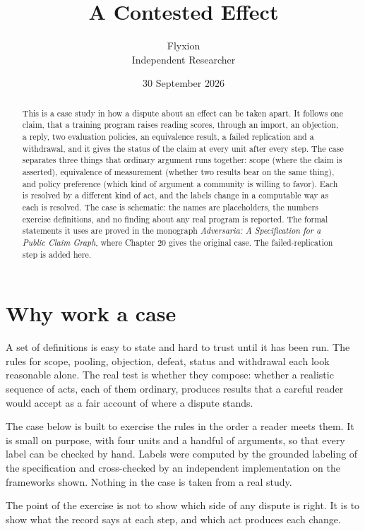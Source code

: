\documentclass[11pt]{article}
\title{A Contested Effect}
\author{Flyxion\\\small Independent Researcher}
\date{30 September 2026}
\begin{document}
\maketitle

\begin{abstract}
\noindent
This is a case study in how a dispute about an effect can be taken apart. It follows one claim, that a training program raises reading scores, through an import, an objection, a reply, two evaluation policies, an equivalence result, a failed replication and a withdrawal, and it gives the status of the claim at every unit after every step. The case separates three things that ordinary argument runs together: scope (where the claim is asserted), equivalence of measurement (whether two results bear on the same thing), and policy preference (which kind of argument a community is willing to favor). Each is resolved by a different kind of act, and the labels change in a computable way as each is resolved. The case is schematic: the names are placeholders, the numbers exercise definitions, and no finding about any real program is reported. The formal statements it uses are proved in the monograph \emph{Adversaria: A Specification for a Public Claim Graph}, where Chapter 20 gives the original case. The failed-replication step is added here.
\end{abstract}

\section{Why work a case}

A set of definitions is easy to state and hard to trust until it has been run. The rules for scope, pooling, objection, defeat, status and withdrawal each look reasonable alone. The real test is whether they compose: whether a realistic sequence of acts, each of them ordinary, produces results that a careful reader would accept as a fair account of where a dispute stands.

The case below is built to exercise the rules in the order a reader meets them. It is small on purpose, with four units and a handful of arguments, so that every label can be checked by hand. Labels were computed by the grounded labeling of the specification and cross-checked by an independent implementation on the frameworks shown. Nothing in the case is taken from a real study.

The point of the exercise is not to show which side of any dispute is right. It is to show what the record says at each step, and which act produces each change.
\end{document}
